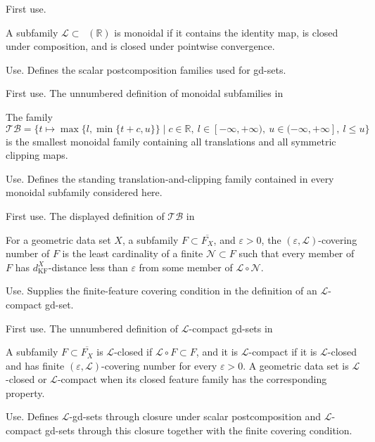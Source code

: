 \documentclass{amsart}
\theoremstyle{plain}
\theoremstyle{definition}
\theoremstyle{remark}
\newcommand{\R}{\mathbb{R}}
\renewcommand{\L}{\mathcal{L}}
\newcommand{\TB}{\mathcal{TB}}
\DeclareMathOperator{\lipone}{Lip_1}
\newcommand{\kf}{d_{\operatorname{KF}}}
\begin{document}
\begin{description}
\textup{First use.} 

\item[\cite{gds2}, Definition~3.1]
A subfamily $\L\subset\lipone(\R)$ is monoidal if it contains the identity map, is closed under composition, and is closed under pointwise convergence.

\textup{Use.} Defines the scalar postcomposition families used for gd-sets.

\textup{First use.} The unnumbered definition of monoidal subfamilies in 

\item[\cite{gds2}, Definition~3.2]
The family
\[\TB=\{t\mapsto\max\{l,\min\{t+c,u\}\}\mid c\in\R,\ l\in[-\infty,+\infty),\ u\in(-\infty,+\infty],\ l\leq u\}\]
is the smallest monoidal family containing all translations and all symmetric clipping maps.

\textup{Use.} Defines the standing translation-and-clipping family contained in every monoidal subfamily considered here.

\textup{First use.} The displayed definition of $\TB$ in 

\item[\cite{gds2}, Definition~3.3]
For a geometric data set $X$, a subfamily $F\subset\overline{F_X}$, and $\varepsilon>0$, the $(\varepsilon,\L)$-covering number of $F$ is the least cardinality of a finite $\mathcal N\subset F$ such that every member of $F$ has $\kf^X$-distance less than $\varepsilon$ from some member of $\L\circ\mathcal N$.

\textup{Use.} Supplies the finite-feature covering condition in the definition of an $\L$-compact gd-set.

\textup{First use.} The unnumbered definition of $\L$-compact gd-sets in 

\item[\cite{gds2}, Definition~3.5]
A subfamily $F\subset\overline{F_X}$ is $\L$-closed if $\L\circ F\subset F$, and it is $\L$-compact if it is $\L$-closed and has finite $(\varepsilon,\L)$-covering number for every $\varepsilon>0$. A geometric data set is $\L$-closed or $\L$-compact when its closed feature family has the corresponding property.

\textup{Use.} Defines $\L$-gd-sets through closure under scalar postcomposition and $\L$-compact gd-sets through this closure together with the finite covering condition.


\end{description}
\end{document}
